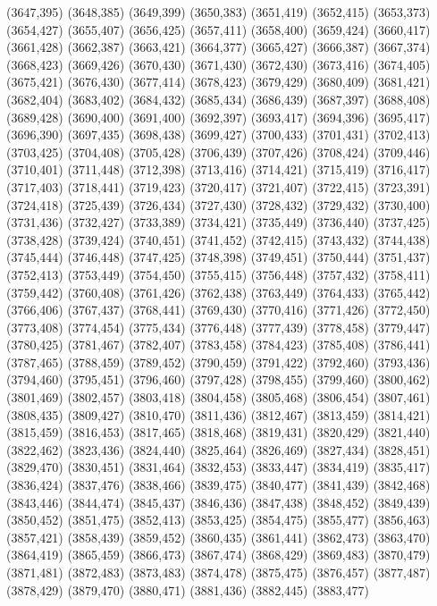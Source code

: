 (3647,395)
(3648,385)
(3649,399)
(3650,383)
(3651,419)
(3652,415)
(3653,373)
(3654,427)
(3655,407)
(3656,425)
(3657,411)
(3658,400)
(3659,424)
(3660,417)
(3661,428)
(3662,387)
(3663,421)
(3664,377)
(3665,427)
(3666,387)
(3667,374)
(3668,423)
(3669,426)
(3670,430)
(3671,430)
(3672,430)
(3673,416)
(3674,405)
(3675,421)
(3676,430)
(3677,414)
(3678,423)
(3679,429)
(3680,409)
(3681,421)
(3682,404)
(3683,402)
(3684,432)
(3685,434)
(3686,439)
(3687,397)
(3688,408)
(3689,428)
(3690,400)
(3691,400)
(3692,397)
(3693,417)
(3694,396)
(3695,417)
(3696,390)
(3697,435)
(3698,438)
(3699,427)
(3700,433)
(3701,431)
(3702,413)
(3703,425)
(3704,408)
(3705,428)
(3706,439)
(3707,426)
(3708,424)
(3709,446)
(3710,401)
(3711,448)
(3712,398)
(3713,416)
(3714,421)
(3715,419)
(3716,417)
(3717,403)
(3718,441)
(3719,423)
(3720,417)
(3721,407)
(3722,415)
(3723,391)
(3724,418)
(3725,439)
(3726,434)
(3727,430)
(3728,432)
(3729,432)
(3730,400)
(3731,436)
(3732,427)
(3733,389)
(3734,421)
(3735,449)
(3736,440)
(3737,425)
(3738,428)
(3739,424)
(3740,451)
(3741,452)
(3742,415)
(3743,432)
(3744,438)
(3745,444)
(3746,448)
(3747,425)
(3748,398)
(3749,451)
(3750,444)
(3751,437)
(3752,413)
(3753,449)
(3754,450)
(3755,415)
(3756,448)
(3757,432)
(3758,411)
(3759,442)
(3760,408)
(3761,426)
(3762,438)
(3763,449)
(3764,433)
(3765,442)
(3766,406)
(3767,437)
(3768,441)
(3769,430)
(3770,416)
(3771,426)
(3772,450)
(3773,408)
(3774,454)
(3775,434)
(3776,448)
(3777,439)
(3778,458)
(3779,447)
(3780,425)
(3781,467)
(3782,407)
(3783,458)
(3784,423)
(3785,408)
(3786,441)
(3787,465)
(3788,459)
(3789,452)
(3790,459)
(3791,422)
(3792,460)
(3793,436)
(3794,460)
(3795,451)
(3796,460)
(3797,428)
(3798,455)
(3799,460)
(3800,462)
(3801,469)
(3802,457)
(3803,418)
(3804,458)
(3805,468)
(3806,454)
(3807,461)
(3808,435)
(3809,427)
(3810,470)
(3811,436)
(3812,467)
(3813,459)
(3814,421)
(3815,459)
(3816,453)
(3817,465)
(3818,468)
(3819,431)
(3820,429)
(3821,440)
(3822,462)
(3823,436)
(3824,440)
(3825,464)
(3826,469)
(3827,434)
(3828,451)
(3829,470)
(3830,451)
(3831,464)
(3832,453)
(3833,447)
(3834,419)
(3835,417)
(3836,424)
(3837,476)
(3838,466)
(3839,475)
(3840,477)
(3841,439)
(3842,468)
(3843,446)
(3844,474)
(3845,437)
(3846,436)
(3847,438)
(3848,452)
(3849,439)
(3850,452)
(3851,475)
(3852,413)
(3853,425)
(3854,475)
(3855,477)
(3856,463)
(3857,421)
(3858,439)
(3859,452)
(3860,435)
(3861,441)
(3862,473)
(3863,470)
(3864,419)
(3865,459)
(3866,473)
(3867,474)
(3868,429)
(3869,483)
(3870,479)
(3871,481)
(3872,483)
(3873,483)
(3874,478)
(3875,475)
(3876,457)
(3877,487)
(3878,429)
(3879,470)
(3880,471)
(3881,436)
(3882,445)
(3883,477)
